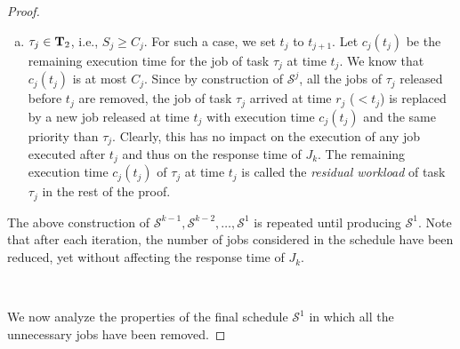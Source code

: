 \begin{proof}
\begin{enumerate}[(a)]
\item $\tau_j \in {\bf T}_2$, i.e., $S_j \geq C_j$. For such a case, we set $t_{j}$ to $t_{j+1}$. Let $c_j(t_j)$ be the remaining execution time for the job of task $\tau_j$ at time $t_j$. We know that $c_j(t_j)$ is at most $C_j$. Since by construction of $\mathcal{S}^j$, all the jobs of $\tau_j$ released before $t_j$ are removed, the job of task $\tau_j$ arrived at time $r_j$ ($< t_j$) is replaced by a new job released at time $t_j$ with execution time $c_j(t_j)$ and the same priority than $\tau_j$. Clearly, this has no impact on the execution of any job executed after $t_j$ and thus on the response time of $J_k$. The remaining execution time $c_j(t_j)$ of $\tau_j$ at time $t_j$ is called the \emph{residual workload} of task $\tau_j$ in the rest of the proof.
\end{enumerate}
 
The above construction of $\mathcal{S}^{k-1}, \mathcal{S}^{k-2}, \ldots, \mathcal{S}^1$ is repeated until producing $\mathcal{S}^1$. Note that after each iteration, the number of jobs considered in the schedule have been reduced, yet without affecting the response time of $J_k$. 

~



We now analyze the properties of the final schedule $\mathcal{S}^1$ in which all the unnecessary jobs have been removed.   


\end{proof}

